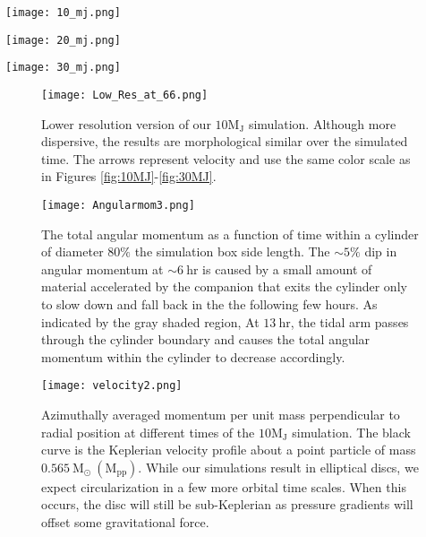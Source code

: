 \documentclass[fleqn,usenatbib]{mnras}
\begin{document}
\begin{figure*}
    \centering
    \texttt{[image: 10\_mj.png]}
    \caption{Evolution of the 10 Jupiter mass disc at $6.6$, $13.2$ and $\mathrm{19.8\ hrs}$. Each panel shows the density distribution in the orbital plane indicated by colour. Velocity vectors are shown on all panels with magnitude indicated by colour (in units of the local Keplerian velocity) and the projected magnitude by the length.}
    \label{fig:10MJ}
\end{figure*}

\begin{figure*}
    \centering
    \texttt{[image: 20\_mj.png]}
    \caption{Evolution of the 20 Jupiter mass disc at $6.6$, $13.2$ and $\mathrm{19.8\ hrs}$. Similar to Figure~\ref{fig:10MJ}}
    \label{fig:20MJ}
\end{figure*}

\begin{figure*}
    \centering
    \texttt{[image: 30\_mj.png]}
    \caption{Evolution of the 30 Jupiter mass disc at $6.6$, $13.2$ and $\mathrm{19.8\ hrs}$. Similar to Figure~\ref{fig:10MJ}}
    \label{fig:30MJ}
\end{figure*}

\begin{figure}
    \centering
    \texttt{[image: Low\_Res\_at\_66.png]}
    \caption{Lower resolution version of our $\mathrm{10 M_J}$ simulation. Although more dispersive, the results are morphological similar  over the simulated time. The arrows represent velocity and use the same color scale as in Figures \ref{fig:10MJ}-\ref{fig:30MJ}.}
    \label{fig:lowres}
\end{figure}

\begin{figure}
    \centering
    \texttt{[image: Angularmom3.png]}
    \caption{The total angular momentum as a function of time within a cylinder of diameter $80\%$ the simulation box side length. The $\sim$$5\%$ dip in angular momentum at $\sim$$6\ \mathrm{hr}$ is caused by a small amount of material accelerated by the companion that exits the cylinder only to slow down and fall back in the the following few hours.  As indicated by the gray shaded region, At $13\ \mathrm{hr}$, the tidal arm passes through the cylinder boundary and causes the total angular momentum within the cylinder to decrease accordingly.}
    \label{fig:angular}
\end{figure}

\begin{figure}
    \centering
    \texttt{[image: velocity2.png]}
    \caption{Azimuthally averaged momentum per unit mass perpendicular to radial position at different times of the $10 \mathrm{M_J}$ simulation. The black curve is the Keplerian velocity profile about a point particle of mass $\mathrm{0.565\ M_\odot\ (M_{pp})}$. While our simulations result in elliptical discs, we expect circularization in a few more orbital time scales. When this occurs, the disc will still be sub-Keplerian as pressure gradients will offset some gravitational force.}
    \label{fig:vel}
\end{figure}
\end{document}
